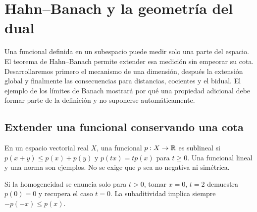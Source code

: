 \chapter{Hahn--Banach y la geometría del dual}\label{cap:v3-02}
Una funcional definida en un subespacio puede medir solo una parte del espacio. El teorema de Hahn--Banach permite extender esa medición sin empeorar su cota. Desarrollaremos primero el mecanismo de una dimensión, después la extensión global y finalmente las consecuencias para distancias, cocientes y el bidual. El ejemplo de los límites de Banach mostrará por qué una propiedad adicional debe formar parte de la definición y no suponerse automáticamente.

\section{Extender una funcional conservando una cota}\label{lec:v3-01}
\begin{definicion}
En un espacio vectorial real $X$, una funcional $p:X\to\mathbb R$ es sublineal si $p(x+y)\leq p(x)+p(y)$ y $p(tx)=tp(x)$ para $t\geq0$. Una funcional lineal y una norma son ejemplos. No se exige que $p$ sea no negativa ni simétrica.
\end{definicion}
Si la homogeneidad se enuncia solo para $t>0$, tomar $x=0$, $t=2$ demuestra $p(0)=0$ y recupera el caso $t=0$. La subaditividad implica siempre $-p(-x)\leq p(x)$.

